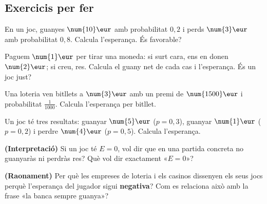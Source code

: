 \subsection{Exercicis per fer}

\begin{exercicis}
\begin{exlist}
  \item En un joc, guanyes $\num{10}\eur$ amb probabilitat $0,2$ i perds $\num{3}\eur$
        amb probabilitat $0,8$. Calcula l'esperança. És favorable?
  \item Paguem $\num{1}\eur$ per tirar una moneda: si surt cara, ens en donen
        $\num{2}\eur$; si creu, res. Calcula el guany net de cada cas i l'esperança. És
        un joc just?
  \item Una loteria ven bitllets a $\num{3}\eur$ amb un premi de $\num{1500}\eur$ i
        probabilitat $\frac{1}{1000}$. Calcula l'esperança per bitllet.
  \item Un joc té tres resultats: guanyar $\num{5}\eur$ ($p=0,3$), guanyar $\num{1}\eur$
        ($p=0,2$) i perdre $\num{4}\eur$ ($p=0,5$). Calcula l'esperança.
  \item \textbf{(Interpretació)} Si un joc té $E=0$, vol dir que en una partida concreta
        no guanyaràs ni perdràs res? Què vol dir exactament «$E=0$»?
  \item \textbf{(Raonament)} Per què les empreses de loteria i els casinos dissenyen els
        seus jocs perquè l'esperança del jugador sigui \textbf{negativa}? Com es
        relaciona això amb la frase «la banca sempre guanya»?
\end{exlist}
\end{exercicis}

